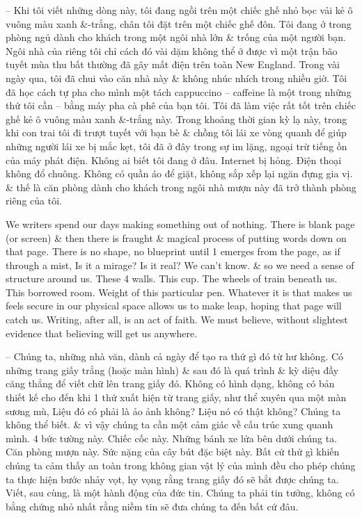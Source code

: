 \documentclass{article}
\begin{document}
\begin{itemize}
	-- Khi tôi viết những dòng này, tôi đang ngồi trên một chiếc ghế nhỏ bọc vải kẻ ô vuông màu xanh \&-trắng, chân tôi đặt trên một chiếc ghế đôn. Tôi đang ở trong phòng ngủ dành cho khách trong một ngôi nhà lớn \& trống của một người bạn. Ngôi nhà của riêng tôi chỉ cách đó vài dặm không thể ở được vì một trận bão tuyết mùa thu bất thường đã gây mất điện trên toàn New England. Trong vài ngày qua, tôi đã chui vào căn nhà này \& không nhúc nhích trong nhiều giờ. Tôi đã học cách tự pha cho mình một tách cappuccino -- caffeine là một trong những thứ tôi cần -- bằng máy pha cà phê của bạn tôi. Tôi đã làm việc rất tốt trên chiếc ghế kẻ ô vuông màu xanh \&-trắng này. Trong khoảng thời gian kỳ lạ này, trong khi con trai tôi đi trượt tuyết với bạn bè \& chồng tôi lái xe vòng quanh để giúp những người lái xe bị mắc kẹt, tôi đã ở đây trong sự im lặng, ngoại trừ tiếng ồn của máy phát điện. Không ai biết tôi đang ở đâu. Internet bị hỏng. Điện thoại không đổ chuông. Không có quần áo để giặt, không sắp xếp lại ngăn đựng gia vị. \& thế là căn phòng dành cho khách trong ngôi nhà mượn này đã trở thành phòng riêng của tôi.
	
	We writers spend our days making something out of nothing. There is blank page (or screen) \& then there is fraught \& magical process of putting words down on that page. There is no shape, no blueprint until 1 emerges from the page, as if through a mist, Is it a mirage? Is it real? We can't know. \& so we need a sense of structure around us. These 4 walls. This cup. The wheels of train beneath us. This borrowed room. Weight of this particular pen. Whatever it is that makes us feels secure in our physical space allows us to make leap, hoping that page will catch us. Writing, after all, is an act of faith. We must believe, without slightest evidence that believing will get us anywhere.
	
	-- Chúng ta, những nhà văn, dành cả ngày để tạo ra thứ gì đó từ hư không. Có những trang giấy trắng (hoặc màn hình) \& sau đó là quá trình \& kỳ diệu đầy căng thẳng để viết chữ lên trang giấy đó. Không có hình dạng, không có bản thiết kế cho đến khi 1 thứ xuất hiện từ trang giấy, như thể xuyên qua một màn sương mù, Liệu đó có phải là ảo ảnh không? Liệu nó có thật không? Chúng ta không thể biết. \& vì vậy chúng ta cần một cảm giác về cấu trúc xung quanh mình. 4 bức tường này. Chiếc cốc này. Những bánh xe lửa bên dưới chúng ta. Căn phòng mượn này. Sức nặng của cây bút đặc biệt này. Bất cứ thứ gì khiến chúng ta cảm thấy an toàn trong không gian vật lý của mình đều cho phép chúng ta thực hiện bước nhảy vọt, hy vọng rằng trang giấy đó sẽ bắt được chúng ta. Viết, sau cùng, là một hành động của đức tin. Chúng ta phải tin tưởng, không có bằng chứng nhỏ nhất rằng niềm tin sẽ đưa chúng ta đến bất cứ đâu.
	

\end{itemize}
\end{document}
